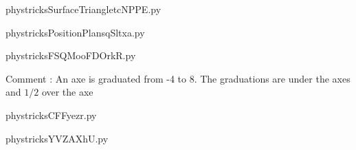     

    \clearpage
    


    \newcommand{\CaptionFigSurfaceTriangletcNPPE}{<+Type your caption here+>}
    \begin{center}
        
    \end{center}
    phystricksSurfaceTriangletcNPPE.py

    

    \clearpage
    


    \newcommand{\CaptionFigPositionPlansqSltxa}{<+Type your caption here+>}
    \begin{center}
        
    \end{center}
    phystricksPositionPlansqSltxa.py

    

    \clearpage
    


    \newcommand{\CaptionFigFSQMooFDOrkR}{<+Type your caption here+>}
    \begin{center}
        
    \end{center}
    phystricksFSQMooFDOrkR.py

    Comment : An axe is graduated from -4 to 8. The graduations are under the axes and $1/2$ over the axe

    \clearpage
    


    \newcommand{\CaptionFigCFFyezr}{<+Type your caption here+>}
    \begin{center}
        
    \end{center}
    phystricksCFFyezr.py

    

    \clearpage
    


    \newcommand{\CaptionFigYVZAXhU}{<+Type your caption here+>}
    \begin{center}
        
    \end{center}
    phystricksYVZAXhU.py

